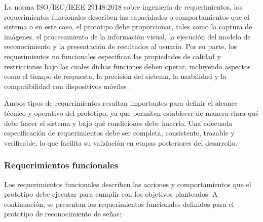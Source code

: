 	La norma ISO/IEC/IEEE 29148:2018 sobre ingeniería de requerimientos, los requerimientos funcionales describen las capacidades o comportamientos que el sistema o en este caso, el prototipo debe proporcionar, tales como la captura de imágenes, el procesamiento de la información visual, la ejecución del modelo de reconocimiento y la presentación de resultados al usuario. Por su parte, los requerimientos no funcionales especifican las propiedades de calidad y restricciones bajo las cuales dichas funciones deben operar, incluyendo aspectos como el tiempo de respuesta, la precisión del sistema, la usabilidad y la compatibilidad con dispositivos móviles \cite{iso29148}.
	
	Ambos tipos de requerimientos resultan importantes para definir el alcance técnico y operativo del prototipo, ya que permiten establecer de manera clara qué debe hacer el sistema y bajo qué condiciones debe hacerlo. Una adecuada especificación de requerimientos debe ser completa, consistente, trazable y verificable, lo que facilita su validación en etapas posteriores del desarrollo.

	
	\subsubsection{Requerimientos funcionales}
	
	Los requerimientos funcionales describen las acciones y comportamientos que el prototipo debe ejecutar para cumplir con los objetivos planteados. A continuación, se presentan los requerimientos funcionales definidos para el prototipo de reconocimiento de señas:
	
